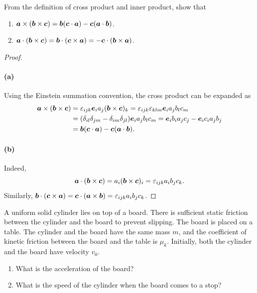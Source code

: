 \documentclass{article}
\begin{document}
\begin{problem}
From the definition of cross product and inner product, show that
\begin{enumerate}
  \item[(a)] $\boldsymbol{a}\times(\boldsymbol{b}\times\boldsymbol{c})=\boldsymbol{b}(\boldsymbol{c}\cdot\boldsymbol{a})-\boldsymbol{c}(\boldsymbol{a}\cdot\boldsymbol{b})$.
  \item[(b)] $\boldsymbol{a}\cdot(\boldsymbol{b}\times\boldsymbol{c})=\boldsymbol{b}\cdot(\boldsymbol{c}\times\boldsymbol{a})=-\boldsymbol{c}\cdot(\boldsymbol{b}\times\boldsymbol{a})$.
\end{enumerate}
\end{problem}

\begin{proof}
	\paragraph{(a)} Using the Einstein summation convention, the cross product can be expanded as
	\begin{align*}
		\boldsymbol{a} \times (\boldsymbol{b} \times \boldsymbol{c}) 
		&= \varepsilon_{ijk} \boldsymbol{e}_i a_j (\boldsymbol{b} \times \boldsymbol{c})_k
		= \varepsilon_{ijk}\varepsilon_{klm} \boldsymbol{e}_i a_j b_l c_m \\
		&= (\delta_{il} \delta_{jm} - \delta_{im} \delta_{jl}) \boldsymbol{e}_i a_j b_l c_m
		= \boldsymbol{e}_i b_i a_j c_j - \boldsymbol{e}_i c_i a_j b_j \\
		&= \boldsymbol{b}(\boldsymbol{c} \cdot \boldsymbol{a}) - \boldsymbol{c} (\boldsymbol{a} \cdot \boldsymbol{b}).
	\end{align*}

	\paragraph{(b)} Indeed, 
	\[ \boldsymbol{a} \cdot (\boldsymbol{b} \times \boldsymbol{c}) = a_i (\boldsymbol{b} \times \boldsymbol{c})_i = \varepsilon_{ijk} a_i b_j c_k. \]
	Similarly, $\boldsymbol{b} \cdot (\boldsymbol{c} \times \boldsymbol{a}) = \boldsymbol{c} \cdot (\boldsymbol{a} \times \boldsymbol{b}) = \varepsilon_{ijk} a_i b_j c_k$.
\end{proof}



\begin{problem}
A uniform solid cylinder lies on top of a board. There is sufficient static friction between the cylinder and the board to prevent slipping. The board is placed on a table. The cylinder and the board have the same mass $m$, and the coefficient of kinetic friction between the board and the table is $\mu_k$. Initially, both the cylinder and the board have velocity $v_0$.
\begin{enumerate}
  \item[(a)] What is the acceleration of the board?
  \item[(b)] What is the speed of the cylinder when the board comes to a stop?
\end{enumerate}
\begin{center}
  
\end{center}
\end{problem}
\end{document}
